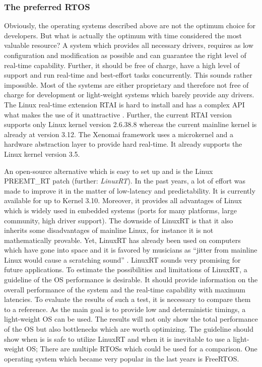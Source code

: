 \subsubsection{The preferred RTOS}
Obviously, the operating systems described above are not the optimum choice for developers. 
But what is actually the optimum with time considered the most valuable resource?
A system which provides all necessary drivers, requires as low configuration and modification as possible and can guarantee the right level of real-time capability. 
Further, it should be free of charge, have a high level of support and run real-time and best-effort tasks concurrently.
This sounds rather impossible. 
Most of the systems are either proprietary and therefore not free of charge for development or light-weight systems which barely provide any drivers.
The Linux real-time extension \ac{RTAI} is hard to install and has a complex \ac{API} what makes the use of it unattractive \cite{mitschang:heulfrvr}.
Further, the current \ac{RTAI} version supports only Linux kernel version 2.6.38.8 \cite{rtai} whereas the current mainline kernel is already at version 3.12. 
The Xenomai framework uses a microkernel and a hardware abstraction layer to provide hard real-time. 
It already supports the Linux kernel version 3.5.
\par
An open-source alternative which is easy to set up and is the Linux PREEMT\_RT patch (further: \textit{LinuxRT}).
In the past years, a lot of effort was made to improve it in the matter of low-latency and predictability.
It is currently available for up to Kernel 3.10.
Moreover, it provides all advantages of Linux which is widely used in embedded systems (ports for many platforms, large community, high driver support).
The downside of LinuxRT is that it also inherits some disadvantages of mainline Linux, for instance it is not mathematically provable.
Yet, LinuxRT has already been used on computers which have gone into space and it is favored by musicians as ``jitter from mainline Linux would cause a scratching sound'' \cite{clark:itrtlfed}.
LinuxRT sounds very promising for future applications.
To estimate the possibilities and limitations of LinuxRT, a guideline of the \ac {OS} performance is desirable.
It should provide information on the overall performance of the system and the real-time capability with maximum latencies.  
To evaluate the results of such a test, it is necessary to compare them to a reference. 
As the main goal is to provide low and deterministic timings, a light-weight \ac{OS} can be used.
The results will not only show the total performance of the \ac{OS} but also bottlenecks which are worth optimizing. 
The guideline should show when is is safe to utilize LinuxRT and when it is inevitable to use a light-weight \ac{OS};
There are multiple \acp{RTOS} which could be used for a comparison. 
One operating system which became very popular in the last years is FreeRTOS.


